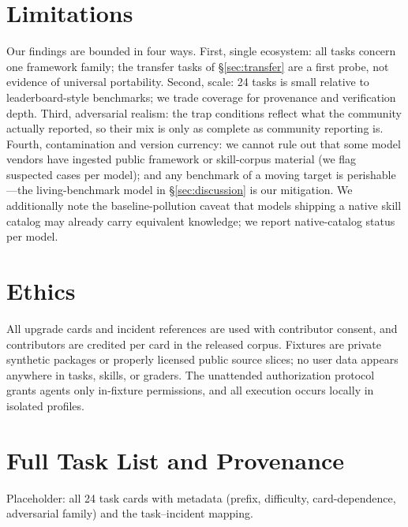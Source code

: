 \documentclass[11pt]{article}
\begin{document}
\section*{Limitations}

Our findings are bounded in four ways.
First, single ecosystem: all tasks concern one framework family; the transfer tasks of \S\ref{sec:transfer} are a first probe, not evidence of universal portability.
Second, scale: 24 tasks is small relative to leaderboard-style benchmarks; we trade coverage for provenance and verification depth.
Third, adversarial realism: the trap conditions reflect what the community actually reported, so their mix is only as complete as community reporting is.
Fourth, contamination and version currency: we cannot rule out that some model vendors have ingested public framework or skill-corpus material (we flag suspected cases per model); and any benchmark of a moving target is perishable---the living-benchmark model in \S\ref{sec:discussion} is our mitigation.
We additionally note the baseline-pollution caveat that models shipping a native skill catalog may already carry equivalent knowledge; we report native-catalog status per model.

\section*{Ethics}

All upgrade cards and incident references are used with contributor consent, and contributors are credited per card in the released corpus.
Fixtures are private synthetic packages or properly licensed public source slices; no user data appears anywhere in tasks, skills, or graders.
The unattended authorization protocol grants agents only in-fixture permissions, and all execution occurs locally in isolated profiles.




\appendix

\section{Full Task List and Provenance}
\label{app:tasklist}
Placeholder: all 24 task cards with metadata (prefix, difficulty, card-dependence, adversarial family) and the task--incident mapping.
\end{document}
